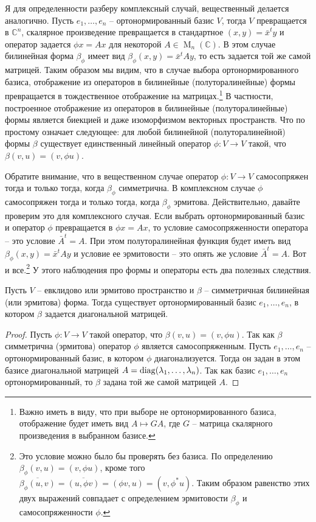 Я для определенности разберу комплексный случай, вещественный делается аналогично. Пусть $e_1,\ldots,e_n$ -- ортонормированный базис $V$, тогда $V$ превращается в $\mathbb C^n$, скалярное произведение превращается в стандартное $(x, y) = \bar x^t y$ и оператор задается $\phi x = Ax$ для некоторой $A\in \operatorname{M}_n(\mathbb C)$. В этом случае билинейная форма $\beta_\phi$ имеет вид $\beta_\phi(x,y) = \bar x^t A y$, то есть задается той же самой матрицей. Таким образом мы видим, что в случае выбора ортонормированного базиса, отображение из операторов в билинейные (полуторалинейные) формы превращается в тождественное отображение на матрицах.\footnote{Важно иметь в виду, что при выборе не ортонормированного базиса, отображение будет иметь вид $A\mapsto G A$, где $G$ -- матрица скалярного произведения в выбранном базисе.} В частности, построенное отображение из операторов в билинейные (полуторалинейные) формы является биекцией и даже изоморфизмом векторных пространств. Что по простому означает следующее: для любой билинейной (полуторалинейной) формы $\beta$ существует единственный линейный оператор $\phi\colon V\to V$ такой, что $\beta(v,u) = (v, \phi u)$.

Обратите внимание, что в вещественном случае оператор $\phi\colon V\to V$ самосопряжен тогда и только тогда, когда $\beta_\phi$ симметрична. В комплексном случае $\phi$ самосопряжен тогда и только тогда, когда $\beta_\phi$ эрмитова. Действительно, давайте проверим это для комплексного случая. Если выбрать ортонормированный базис и оператор $\phi$ превращается в $\phi x = A x$, то условие самосопряженности оператора -- это условие $\bar A^t = A$. При этом полуторалинейная функция будет иметь вид $\beta_\phi(x, y) = \bar x^t A y$ и условие ее эрмитовости -- это опять же условие $\bar A^t = A$. Вот и все.\footnote{Это условие можно было бы проверять без базиса. По определению $\beta_\phi(v, u) = (v, \phi u)$, кроме того $\overline{\beta_\phi(u, v)} = \overline{(u, \phi v)} = (\phi v, u) = (v, \phi^* u)$. Таким образом равенство этих двух выражений совпадает с определением эрмитовости $\beta_\phi$ и самосопряженности $\phi$.} У этого наблюдения про формы и операторы есть два полезных следствия.

\begin{claim}\label{claim::BilinOrthoDiag}
Пусть $V$ -- евклидово или эрмитово пространство и $\beta$ -- симметричная билинейная (или эрмитова) форма. Тогда существует ортонормированный базис $e_1,\ldots,e_n$, в котором $\beta$ задается диагональной матрицей.
\end{claim}
\begin{proof}
Пусть $\phi\colon V\to V$ такой оператор, что $\beta(v, u) = (v, \phi u)$. Так как $\beta$ симметрична (эрмитова) оператор $\phi$ является самосопряженным. Пусть $e_1,\ldots,e_n$ -- ортонормированный базис, в котором $\phi$ диагонализуется. Тогда он задан в этом базисе диагональной матрицей $A = \operatorname{diag}(\lambda_1,\ldots,\lambda_n)$. Так как базис $e_1,\ldots,e_n$ ортонормированный, то $\beta$ задана той же самой матрицей $A$.
\end{proof}

